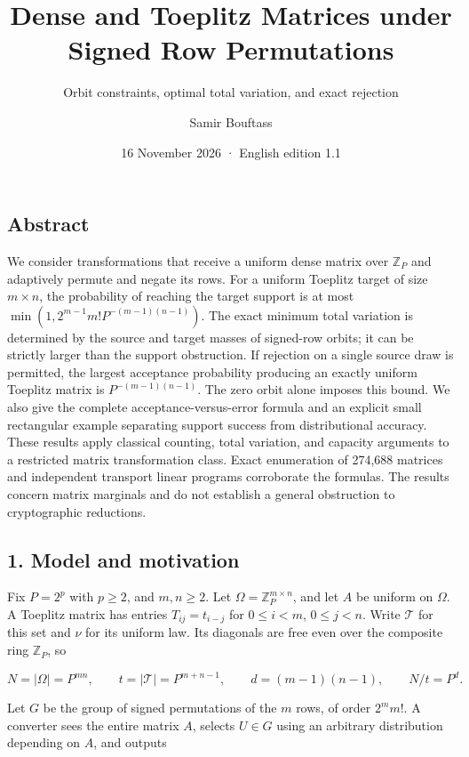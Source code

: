 \documentclass[
]{article}
\title{Dense and Toeplitz Matrices under Signed Row Permutations}
\subtitle{Orbit constraints, optimal total variation, and exact
rejection}
\author{Samir Bouftass}
\date{16 November 2026 · English edition 1.1}
\begin{document}
\maketitle

\subsection{Abstract}\label{abstract}

We consider transformations that receive a uniform dense matrix over
\(\mathbb Z_P\) and adaptively permute and negate its rows. For a
uniform Toeplitz target of size \(m\times n\), the probability of
reaching the target support is at most
\(\min(1,2^{m-1}m!P^{-(m-1)(n-1)})\). The exact minimum total variation
is determined by the source and target masses of signed-row orbits; it
can be strictly larger than the support obstruction. If rejection on a
single source draw is permitted, the largest acceptance probability
producing an exactly uniform Toeplitz matrix is \(P^{-(m-1)(n-1)}\). The
zero orbit alone imposes this bound. We also give the complete
acceptance-versus-error formula and an explicit small rectangular
example separating support success from distributional accuracy. These
results apply classical counting, total variation, and capacity
arguments to a restricted matrix transformation class. Exact enumeration
of 274,688 matrices and independent transport linear programs
corroborate the formulas. The results concern matrix marginals and do
not establish a general obstruction to cryptographic reductions.

\subsection{1. Model and motivation}\label{model-and-motivation}

Fix \(P=2^p\) with \(p\ge2\), and \(m,n\ge2\). Let
\(\Omega=\mathbb Z_P^{m\times n}\), and let \(A\) be uniform on
\(\Omega\). A Toeplitz matrix has entries \(T_{ij}=t_{i-j}\) for
\(0\le i<m\), \(0\le j<n\). Write \(\mathcal T\) for this set and
\(\nu\) for its uniform law. Its diagonals are free even over the
composite ring \(\mathbb Z_P\), so

\[
N=|\Omega|=P^{mn},\qquad t=|\mathcal T|=P^{m+n-1},\qquad
d=(m-1)(n-1),\qquad N/t=P^d.
\tag{1}
\]

Let \(G\) be the group of signed permutations of the \(m\) rows, of
order \(2^m m!\). A converter sees the entire matrix \(A\), selects
\(U\in G\) using an arbitrary distribution depending on \(A\), and
outputs
\end{document}
